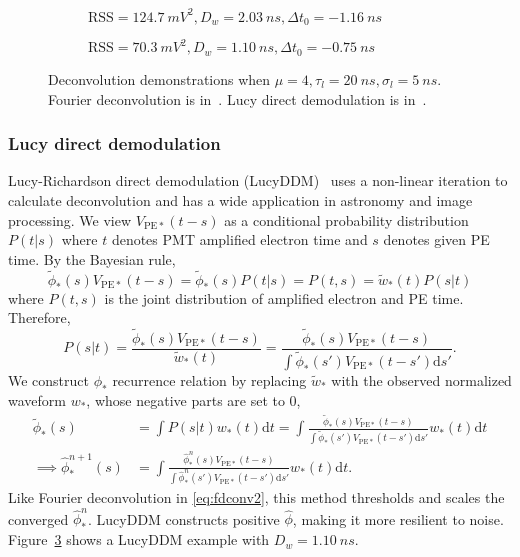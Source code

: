 \begin{figure}[H]
  \begin{subfigure}{0.5\textwidth}
    \centering
    \resizebox{\textwidth}{!}{}
    \caption{\label{fig:fd} $\mathrm{RSS}=\SI{124.7}{mV^2},D_w=\SI{2.03}{ns},\Delta t_0=\SI{-1.16}{ns}$}
  \end{subfigure}
  \begin{subfigure}{0.5\textwidth}
    \centering
    \resizebox{\textwidth}{!}{}
    \caption{\label{fig:lucy} $\mathrm{RSS}=\SI{70.3}{mV^2},D_w=\SI{1.10}{ns},\Delta t_0=\SI{-0.75}{ns}$}
  \end{subfigure}
  \caption{Deconvolution demonstrations when $\mu=4, \tau_l=\SI{20}{ns}, \sigma_l=\SI{5}{ns}$. Fourier deconvolution is in~. Lucy direct demodulation is in~.}
\end{figure}

\subsubsection{Lucy direct demodulation}

Lucy-Richardson direct demodulation (LucyDDM)~\cite{lucy_iterative_1974} uses a non-linear iteration to calculate deconvolution and has a wide application in astronomy \cite{li_richardson-lucy_2019} and image processing. We view $V_{\mathrm{PE}*}(t-s)$ as a conditional probability distribution $P(t|s)$ where $t$ denotes PMT amplified electron time and $s$ denotes given PE time. By the Bayesian rule, 
\begin{equation}
  \label{eq:lucy}
  \tilde{\phi}_*(s) V_{\mathrm{PE}*}(t-s) = \tilde{\phi}_*(s)P(t|s) = P(t,s) = \tilde{w}_*(t)P(s|t)
\end{equation}
where $P(t, s)$ is the joint distribution of amplified electron and PE time. Therefore,
\begin{equation}
  \label{eq:ptt}
  P(s|t) = \frac{\tilde{\phi}_*(s) V_{\mathrm{PE}*}(t-s)}{\tilde{w}_*(t)} = \frac{\tilde{\phi}_*(s) V_{\mathrm{PE}*}(t-s)}{\int\tilde{\phi}_*(s') V_{\mathrm{PE}*}(t-s')\mathrm{d}s'}.
\end{equation}
We construct $\phi_*$ recurrence relation by replacing $\tilde{w}_*$ with the observed normalized waveform $w_*$, whose negative parts are set to 0,
\begin{equation}
  \label{eq:iter}
  \begin{aligned}
    \tilde{\phi}_*(s) & = \int P(s|t) w_*(t)\mathrm{d}t = \int \frac{\tilde{\phi}_*(s) V_{\mathrm{PE}*}(t-s)}{\int\tilde{\phi}_*(s') V_{\mathrm{PE}*}(t-s')\mathrm{d}s'} w_*(t) \mathrm{d}t \\
    \implies \hat{\phi}_*^{n+1}(s) & = \int \frac{\hat{\phi}_*^n(s) V_{\mathrm{PE}*}(t-s)}{\int\hat{\phi}_*^n(s') V_{\mathrm{PE}*}(t-s')\mathrm{d}s'} w_*(t) \mathrm{d}t.
  \end{aligned}
\end{equation}
Like Fourier deconvolution in \eqref{eq:fdconv2}, this method thresholds and scales the converged $\hat{\phi}_*^{n}$. LucyDDM constructs positive $\hat{\phi}$, making it more resilient to noise. Figure~\ref{fig:lucy} shows a LucyDDM example with $D_w = \SI{1.10}{ns}$. 

